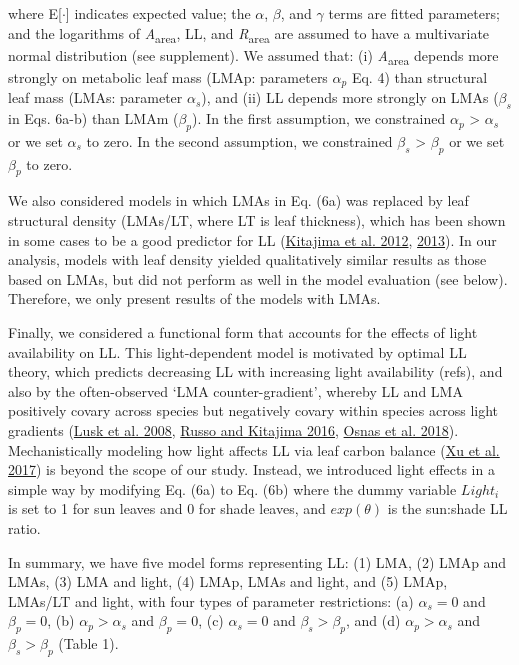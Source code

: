 \documentclass[
  12pt,
  a4paper,
,tablecaptionabove
]{scrartcl}
\begin{document}
where E{[}\(\cdot\){]} indicates expected value;
the \(\alpha\), \(\beta\), and \(\gamma\) terms are fitted parameters;
and the logarithms of \emph{A}\textsubscript{area}, LL, and \emph{R}\textsubscript{area} are assumed to have a multivariate normal distribution (see supplement).
We assumed that:
(i) \emph{A}\textsubscript{area} depends more strongly on metabolic leaf mass (LMAp: parameters \(\alpha_p\) Eq. 4) than structural leaf mass (LMAs: parameter \(\alpha_s\)), and
(ii) LL depends more strongly on LMAs (\(\beta_s\) in Eqs. 6a-b) than LMAm (\(\beta_p\)).
In the first assumption, we constrained \(\alpha_p\) \textgreater{} \(\alpha_s\) or we set \(\alpha_s\) to zero.
In the second assumption, we constrained \(\beta_s\) \textgreater{} \(\beta_p\) or we set \(\beta_p\) to zero.

We also considered models in which LMAs in Eq. (6a) was replaced by leaf structural density (LMAs/LT, where LT is leaf thickness), which has been shown in some cases to be a good predictor for LL (\protect\hyperlink{ref-Kitajima2012}{Kitajima et al. 2012}, \protect\hyperlink{ref-Kitajima2013}{2013}).
In our analysis, models with leaf density yielded qualitatively similar results as those based on LMAs, but did not perform as well in the model evaluation (see below).
Therefore, we only present results of the models with LMAs.

Finally, we considered a functional form that accounts for the effects of light availability on LL.
This light-dependent model is motivated by optimal LL theory, which predicts decreasing LL with increasing light availability (refs), and also by the often-observed `LMA counter-gradient', whereby LL and LMA positively covary across species but negatively covary within species across light gradients (\protect\hyperlink{ref-Lusk2008}{Lusk et al. 2008}, \protect\hyperlink{ref-Russo2016}{Russo and Kitajima 2016}, \protect\hyperlink{ref-Osnas2018}{Osnas et al. 2018}).
Mechanistically modeling how light affects LL via leaf carbon balance (\protect\hyperlink{ref-Xu2017}{Xu et al. 2017}) is beyond the scope of our study.
Instead, we introduced light effects in a simple way by modifying Eq. (6a) to Eq. (6b) where the dummy variable \(Light_i\) is set to 1 for sun leaves and 0 for shade leaves, and \(exp(\theta)\) is the sun:shade LL ratio.

In summary, we have five model forms representing LL:
(1) LMA,
(2) LMAp and LMAs,
(3) LMA and light,
(4) LMAp, LMAs and light, and
(5) LMAp, LMAs/LT and light,
with four types of parameter restrictions:
(a) \(\alpha_s = 0\) and \(\beta_p = 0\),
(b) \(\alpha_p > \alpha_s\) and \(\beta_p = 0\),
(c) \(\alpha_s = 0\) and \(\beta_s > \beta_p\), and
(d) \(\alpha_p > \alpha_s\) and \(\beta_s > \beta_p\) (Table 1).
\end{document}
